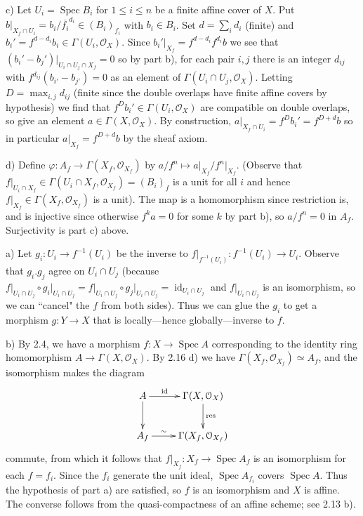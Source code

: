 \documentclass{report}
\renewcommand{\O}{\mathcal{O}}
\DeclareMathOperator{\id}{id}
\DeclareMathOperator{\Spec}{Spec}
\begin{document}
\noindent
c)	Let $U_i=\Spec B_i$ for $1\le i\le n$ be a finite affine cover of $X$.
Put $b\big|_{X_f\cap U_{i}}=b_{i}/\overline{f_i}^{d_{i}}\in (B_{i})_{f_i}$ with $b_{i}\in B_{i}$.
Set $d=\sum_i d_i$ (finite) and $b_i'=f^{d-d_i} b_i\in \Gamma(U_i,\O_X)$.
Since $b_i'\big|_{X_f}=f^{d-d_i}f^{d_i}b$ we see that $(b_i'-b_j')\big|_{U_i\cap U_j\cap X_f}=0$ so 
by part b), for each pair $i,j$ there is an integer $d_{ij}$ with $f^{d_{ij}}(b_{i'}-b_{j'})=0$ as an element of $\Gamma(U_i\cap U_j,\O_X)$.
Letting $D=\max_{i,j} d_{ij}$ (finite since the double overlaps have finite affine covers by hypothesis)
we find that $f^Db_i'\in \Gamma(U_i,\O_X)$ are compatible on double overlaps, so give an element $a\in \Gamma(X,\O_X)$.
By construction, $a\big|_{X_f\cap U_i}=f^Db_i'=f^{D+d} b$ so in particular $a\big|_{X_f}=f^{D+d}b$ by the sheaf axiom. 

\noindent
d)	Define $\varphi:A_f\rightarrow \Gamma(X_f,\O_{X_f})$ by $ a/f^{n}\mapsto a\big|_{X_f}/f^n\big|_{X_f}$.
(Observe that $f\big|_{U_i\cap X_f}\in \Gamma(U_i\cap X_f,\O_{X_f})=(B_i)_f$ is a unit for all $i$
and hence $f\big|_{X_f}\in \Gamma(X_f,\O_{X_f})$ is a unit).
The map is a homomorphism since restriction is, and is injective since otherwise $f^k a=0$ for some $k$ by part b),
so $a/f^n=0$ in $A_f$.  Surjectivity is part c) above.



\bigskip
{}	a)	Let $g_i:U_i\rightarrow f^{-1}(U_i)$ be the inverse to $f\big|_{f^{-1}(U_i)}:f^{-1}(U_i)\rightarrow U_i$.
Observe that $g_i.g_j$ agree on $U_i\cap U_j$ (because 
$f\big|_{U_i\cap U_j}\circ g_i\big|_{U_i\cap U_j}=f\big|_{U_i\cap U_j}\circ g_j\big|_{U_i\cap U_j}=\id_{U_i\cap U_j}$ and 
$f\big|_{U_i\cap U_j}$ is an isomorphism,
so we can ``cancel" the $f$ from both sides).  Thus we can glue the $g_i$ to get a morphism $g:Y\rightarrow X$
that is locally---hence globally---inverse to $f$.

\noindent
b)	By 2.4, we have a morphism $f:X\rightarrow \Spec A$ corresponding to the identity ring homomorphism $A\rightarrow \Gamma(X,\O_X)$.
By 2.16 d) we have $\Gamma(X_f,\O_{X_f})\simeq A_f$, and the isomorphism makes the diagram
\begin{equation}
\xymatrix{
A  \ar[r]^-{\id}\ar[d] & \Gamma(X,\O_X)\ar[d]^-{\rm res}\\
A_f \ar[r]^-{\sim} & \Gamma(X_f,\O_{X_f})
}\nonumber
\end{equation}
commute, from which it follows that $f\big|_{X_f}:X_f\rightarrow \Spec A_f$ is an isomorphism for each $f=f_i$.
Since the $f_i$ generate the unit ideal, $\Spec A_{f_i}$ covers $\Spec A$.  Thus the hypothesis of part a)
are satisfied, so $f$ is an isomorphism and $X$ is affine.  The converse follows from the quasi-compactness
of an affine scheme; see 2.13 b).
\end{document}
